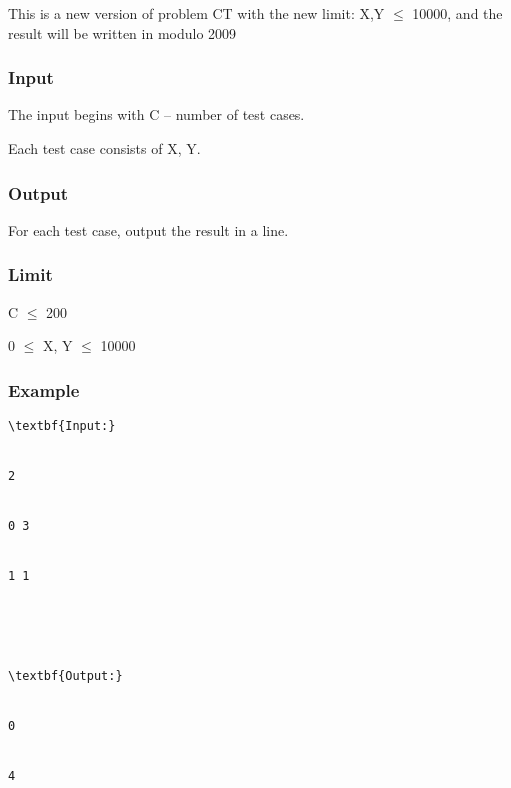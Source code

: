 



   This is a new version of problem CT with the new limit: X,Y $\le$ 10000, and the result will be written in modulo 2009  

\subsubsection{   Input  }

   The input begins with C – number of test cases.   


   Each test case consists of X, Y.  

\subsubsection{   Output  }




   For each test case, output the result in a line.  

\subsubsection{   Limit  }

   C  $\le$  200   


   0  $\le$  X, Y  $\le$  10000  

\subsubsection{   Example  }
\begin{verbatim}
\textbf{Input:}


2


0 3


1 1





\textbf{Output:}


0


4\end{verbatim}
